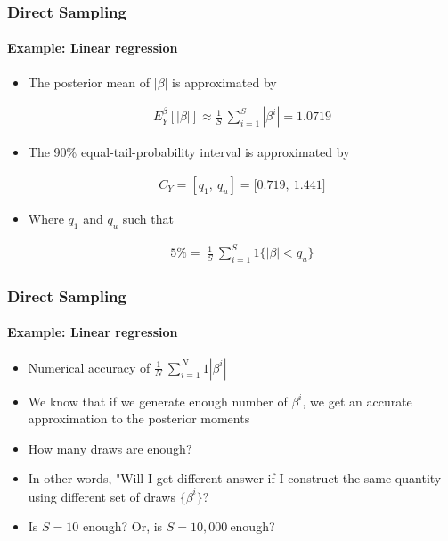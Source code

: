 \documentclass[
  shownotes,
  xcolor={svgnames},
  hyperref={colorlinks,citecolor=DarkBlue,linkcolor=DarkRed,urlcolor=DarkBlue}
  , aspectratio=169]{beamer}
\begin{document}
\begin{frame}[fragile]
\frametitle{Direct Sampling}  
\framesubtitle{Example: Linear regression}

\begin{itemize}
\item The posterior mean of $\left| \beta \right|$ is approximated by

\begin{align}
E_{Y}^{\beta}\left\lbrack \left| \beta \right| \right\rbrack \approx \frac{1}{S}\ \sum_{i = 1}^{S}{\left| \beta^{i} \right| = 1.0719}
\end{align}

\item The 90\% equal-tail-probability interval is approximated by

\begin{align}
C_{Y} = \left\lbrack q_{1},\ q_{u} \right\rbrack = \lbrack 0.719,\ 1.441\rbrack
\end{align}


\item Where $q_{1}$ and $q_{u}$ such that

\begin{align}
5\% = \ \frac{1}{S}\ \sum_{i = 1}^{S}{1\{\left| \beta \right| < q_{u}\}}
\end{align}
\end{itemize}

\end{frame}
\begin{frame}[fragile]
\frametitle{Direct Sampling}
\framesubtitle{Example: Linear regression}

\begin{itemize}
\item Numerical accuracy of $\frac{1}{N}\ \sum_{i = 1}^{N}{1\left| \beta^{i} \right|}$
\medskip
\item We know that if we generate enough number of $\beta^{i}$, we get an accurate approximation to the posterior moments
\medskip
\item How many draws are enough?
\medskip
\item In other words, "Will I get different answer if I construct the same quantity using different set of draws ${\{\beta}^{i}\}$?
\medskip
\item Is $S = 10$ enough? Or, is $S = 10,000\ $enough?
\end{itemize}
\end{frame}
\end{document}
